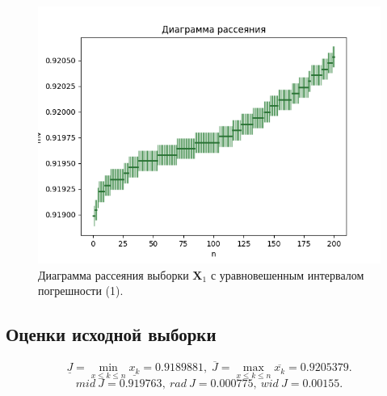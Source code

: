 \documentclass{article}
\begin{document}
\begin{figure}[H]
            \centering
		\includegraphics[width = 160 mm, height = 120 mm]{result2.png}
		\caption{Диаграмма рассеяния выборки $\textbf{X}_1$ с уравновешенным
интервалом погрешности (1).}
		\label{fig:six}
\end{figure}
\subsection{Оценки исходной выборки}
$$\underline{J} = \min\limits_{x \leq k \leq n} \underline{x_k} = 0.9189881,\;\overline{J} = \max\limits_{x \leq k \leq n} \overline{x_k} = 0.9205379.$$
$$ mid\:J = 0.919763,\:rad\:J = 0.000775,\:wid\:J = 0.00155.$$
\end{document}
